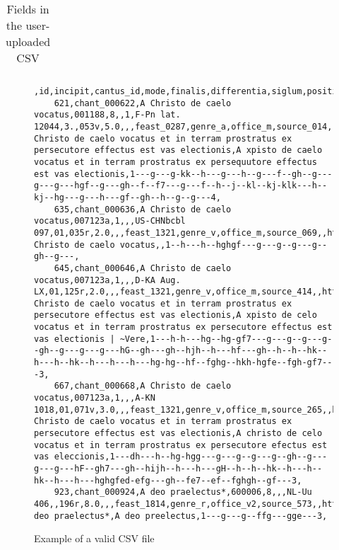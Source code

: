 \begin{longtable}{| p{} | p{} | p{} | p{} |}
\caption{Fields in the user-uploaded CSV}
\end{longtable}

\begin{figure}[h]
    \begin{lstlisting}[breaklines]
    ,id,incipit,cantus_id,mode,finalis,differentia,siglum,position,folio,sequence,marginalia,cao_concordances,feast_id,genre_id,office_id,source_id,melody_id,drupal_path,full_text,full_text_manuscript,volpiano,notes
    621,chant_000622,A Christo de caelo vocatus,001188,8,,1,F-Pn lat. 12044,3.,053v,5.0,,,feast_0287,genre_a,office_m,source_014,,http://cantus.uwaterloo.ca/chant/399542/,A Christo de caelo vocatus et in terram prostratus ex persecutore effectus est vas electionis,A xpisto de caelo vocatus et in terram prostratus ex persequutore effectus est vas electionis,1---g---g-kk--h---g---h--g---f--gh--g---g---g---hgf--g---gh--f--f7---g---f--h--j--kl--kj-klk---h--kj--hg---g---h---gf--gh--h--g--g---4,
    635,chant_000636,A Christo de caelo vocatus,007123a,1,,,US-CHNbcbl 097,01,035r,2.0,,,feast_1321,genre_v,office_m,source_069,,http://cantus.uwaterloo.ca/chant/665425/,A Christo de caelo vocatus,,1--h---h--hghgf---g---g--g---g--gh--g---,
    645,chant_000646,A Christo de caelo vocatus,007123a,1,,,D-KA Aug. LX,01,125r,2.0,,,feast_1321,genre_v,office_m,source_414,,http://cantus.uwaterloo.ca/chant/617583/,A Christo de caelo vocatus et in terram prostratus ex persecutore effectus est vas electionis,A xpisto de celo vocatus et in terram prostratus ex persecutore effectus est vas electionis | ~Vere,1---h-h---hg--hg-gf7---g---g--g---g--gh--g---g---g---hG--gh---gh--hjh--h---hf---gh--h--h--hk--h---h--hk--h---h---h---hg-hg--hf--fghg--hkh-hgfe--fgh-gf7---3,
    667,chant_000668,A Christo de caelo vocatus,007123a,1,,,A-KN 1018,01,071v,3.0,,,feast_1321,genre_v,office_m,source_265,,http://cantus.uwaterloo.ca/chant/293103/,A Christo de caelo vocatus et in terram prostratus ex persecutore effectus est vas electionis,A christo de celo vocatus et in terram prostratus ex persecutore efectus est vas eleccionis,1---dh---h--hg-hgg---g---g--g---g--gh--g---g---g---hF--gh7---gh--hijh--h---h---gH--h--h--hk--h---h--hk--h---h---hghgfed-efg---gh--fe7--ef--fghgh--gf---3,
    923,chant_000924,A deo praelectus*,600006,8,,,NL-Uu 406,,196r,8.0,,,feast_1814,genre_r,office_v2,source_573,,http://cantus.uwaterloo.ca/chant/497010/,A deo praelectus*,A deo preelectus,1---g---g--ffg---gge---3,
    \end{lstlisting}
\caption{Example of a valid CSV file}
\end{figure}

